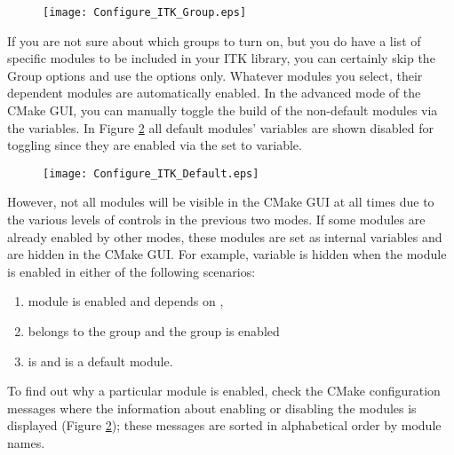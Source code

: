 \begin{figure}[htb!]
\centering
\texttt{[image: Configure\_ITK\_Group.eps]}
\label{fig:ConfigITKGroup}
\end{figure}

If you are not sure about which groups to turn on, but you do have a list of
specific modules to be included in your ITK library, you can certainly skip the
Group options and use the  options only. Whatever
modules you select, their dependent modules are automatically enabled. In the
advanced mode of the CMake GUI, you can manually toggle the build of the
non-default modules via the  variables. In Figure
\ref{fig:ConfigITKDefault} all default modules' 
variables are shown disabled for toggling since they are enabled via the
 set to  variable.

\begin{figure}[htb!]
\centering
\texttt{[image: Configure\_ITK\_Default.eps]}
\label{fig:ConfigITKDefault}
\end{figure}

However, not all modules will be visible in the CMake GUI at all times due to
the various levels of controls in the previous two modes. If some modules are
already enabled by other modes, these modules are set as internal variables and
are hidden in the CMake GUI. For example,  variable is
hidden when the module  is enabled in either of the following
scenarios:
\begin{enumerate}
\item module  is enabled and depends on ,
\item {} belongs to the group  and the
group is enabled
\item {} is  and  is a
default module.
\end{enumerate}

To find out why a particular module is enabled, check the CMake configuration
messages where the information about enabling or disabling the modules is
displayed (Figure \ref{fig:ConfigITKDefault}); these messages are sorted in
alphabetical order by module names.


